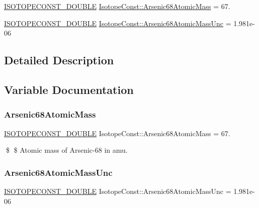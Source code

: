 \begin{DoxyCompactItemize}
\item 
\mbox{\hyperlink{group___isotope_const-_macros_ga8f45a7272ce02c0b4c65c44636ed719a}{I\+S\+O\+T\+O\+P\+E\+C\+O\+N\+S\+T\+\_\+\+D\+O\+U\+B\+LE}} \mbox{\hyperlink{group___isotope_const-_arsenic-_as68_ga5275c953b6dee9fc7fb0ae2f49f3f79b}{Isotope\+Const\+::\+Arsenic68\+Atomic\+Mass}} = 67.
\item 
\mbox{\hyperlink{group___isotope_const-_macros_ga8f45a7272ce02c0b4c65c44636ed719a}{I\+S\+O\+T\+O\+P\+E\+C\+O\+N\+S\+T\+\_\+\+D\+O\+U\+B\+LE}} \mbox{\hyperlink{group___isotope_const-_arsenic-_as68_ga8b2623bf5b3e6042794a10934eb1b19f}{Isotope\+Const\+::\+Arsenic68\+Atomic\+Mass\+Unc}} = 1.\+981e-\/06
\end{DoxyCompactItemize}


\subsection{Detailed Description}


\subsection{Variable Documentation}
\mbox{\label{group___isotope_const-_arsenic-_as68_ga5275c953b6dee9fc7fb0ae2f49f3f79b}} 
\subsubsection{\texorpdfstring{Arsenic68\+Atomic\+Mass}{Arsenic68AtomicMass}}
{\footnotesize\ttfamily \mbox{\hyperlink{group___isotope_const-_macros_ga8f45a7272ce02c0b4c65c44636ed719a}{I\+S\+O\+T\+O\+P\+E\+C\+O\+N\+S\+T\+\_\+\+D\+O\+U\+B\+LE}} Isotope\+Const\+::\+Arsenic68\+Atomic\+Mass = 67.}

\$ \$ Atomic mass of Arsenic-\/68 in amu. \mbox{\label{group___isotope_const-_arsenic-_as68_ga8b2623bf5b3e6042794a10934eb1b19f}} 
\subsubsection{\texorpdfstring{Arsenic68\+Atomic\+Mass\+Unc}{Arsenic68AtomicMassUnc}}
{\footnotesize\ttfamily \mbox{\hyperlink{group___isotope_const-_macros_ga8f45a7272ce02c0b4c65c44636ed719a}{I\+S\+O\+T\+O\+P\+E\+C\+O\+N\+S\+T\+\_\+\+D\+O\+U\+B\+LE}} Isotope\+Const\+::\+Arsenic68\+Atomic\+Mass\+Unc = 1.\+981e-\/06}

